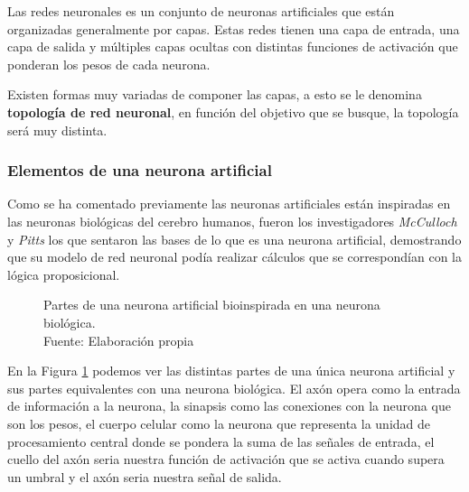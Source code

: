 Las redes neuronales es un conjunto de neuronas artificiales que están organizadas generalmente por capas. Estas redes tienen una capa de entrada, una capa de salida y múltiples capas ocultas con distintas funciones de activación que ponderan los pesos de cada neurona.

Existen formas muy variadas de componer las capas, a esto se le denomina \textbf{topología de red neuronal}, en función del objetivo que se busque, la topología será muy distinta.

\subsubsection{Elementos de una neurona artificial}

Como se ha comentado previamente las neuronas artificiales están inspiradas en las neuronas biológicas del cerebro humanos, fueron los investigadores \textit{McCulloch} y \textit{Pitts} \cite{mcculloch1943logical} los que sentaron las bases de lo que es una neurona artificial, demostrando que su modelo de red neuronal podía realizar cálculos que se correspondían con la lógica proposicional.


\begin{figure}[H]
  \centering
  \centerline{}
  \caption{Partes de una neurona artificial bioinspirada en una neurona biológica.\\Fuente: Elaboración propia}
  \label{fig:artificial-neuron}
\end{figure}

En la Figura \ref{fig:artificial-neuron} podemos ver las distintas partes de una única neurona artificial y sus partes equivalentes con una neurona biológica. El axón opera como la entrada de información a la neurona, la sinapsis como las conexiones con la neurona que son los pesos, el cuerpo celular como la neurona que representa la unidad de procesamiento central donde se pondera la suma de las señales de entrada, el cuello del axón seria nuestra función de activación que se activa cuando supera un umbral y el axón seria nuestra señal de salida.



